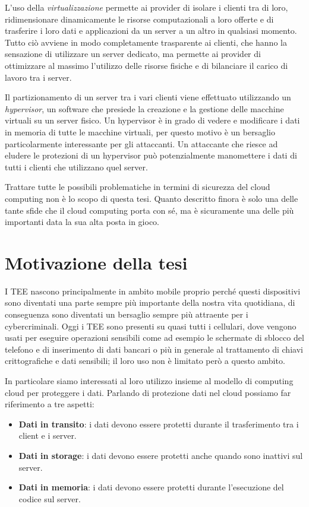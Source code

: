 \documentclass[12pt,italian]{report}
\begin{document}
L'uso della \textit{virtualizzazione} permette ai provider di isolare
i clienti tra di loro, ridimensionare
dinamicamente le risorse computazionali a loro offerte e di trasferire
i loro dati e applicazioni da un server a un altro in qualsiasi
momento.
Tutto ciò avviene in modo completamente trasparente ai clienti, che hanno la
sensazione di utilizzare un server dedicato,
ma permette ai provider di ottimizzare al massimo l'utilizzo delle risorse
fisiche e di bilanciare il carico di lavoro tra i server.

\bigbreak \noindent

Il partizionamento di un server tra i vari clienti viene effettuato
utilizzando un \textit{hypervisor}, un software che presiede la creazione
e la gestione delle macchine virtuali su un server fisico.
Un hypervisor è in grado di vedere e modificare i dati in memoria di tutte
le macchine virtuali, per questo motivo è un bersaglio particolarmente
interessante per gli attaccanti.
Un attaccante che riesce ad eludere le protezioni di un hypervisor può
potenzialmente manomettere i dati di tutti i clienti che utilizzano quel
server.

Trattare tutte le possibili problematiche in termini di sicurezza del
cloud computing non è lo scopo di questa tesi.
Quanto descritto finora è solo una delle tante sfide che il cloud computing
porta con sé, ma è sicuramente una delle più importanti data la sua alta
posta in gioco.

\section{Motivazione della tesi}
\label{sec:motivazione}
I TEE nascono principalmente in ambito mobile proprio perché questi dispositivi
sono diventati una parte sempre più importante della nostra vita quotidiana,
di conseguenza sono diventati un bersaglio sempre più attraente per i
cybercriminali.
Oggi i TEE sono presenti su quasi tutti i cellulari, dove vengono usati per
eseguire operazioni sensibili come ad esempio le schermate di sblocco
del telefono e di inserimento di dati bancari o più in generale al
trattamento di chiavi crittografiche e dati sensibili;
il loro uso non è limitato però a questo ambito.

In particolare siamo interessati al loro utilizzo insieme al modello di
computing cloud per proteggere i dati.
Parlando di protezione dati nel cloud possiamo far riferimento a tre
aspetti:
\begin{itemize}
    \item \textbf{Dati in transito}: i dati devono essere protetti durante
    il trasferimento tra i client e i server.
    \item \textbf{Dati in storage}: i dati devono essere protetti anche
    quando sono inattivi sul server.
    \item \textbf{Dati in memoria}: i dati devono essere protetti durante
    l'esecuzione del codice sul server.
\end{itemize}
\end{document}

